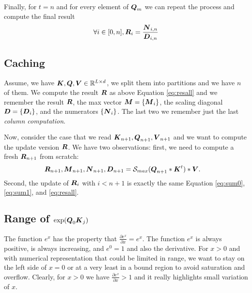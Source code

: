\documentclass[journal]{IEEEtran}
\begin{document}
Finally, for $t=n$ and for every element of ${\boldsymbol Q}_m$ we can repeat
the process and compute the final result
\begin{equation}
  \label{eq:resall}
 \forall i \in [0,n],\/ \Vc{R}_i = \frac{\Vc{N}_{i,n}}{\Vc{D}_{i,n}}
\end{equation}
\begin{comment}
Each $\Vc{R}_i$ are independent.  Space requirements: $\Vc{Q}_i,
\Vc{K}_i, \Vc{V}_i \in \R^{d \times d}$,, $\Vc{Q}_i\Vc{K}_j \in
\R^{d\times d}$, $\exp\Vc{Q}_i\Vc{K}_j \in \R^{d\times d}$
$\Vc{D}_{0,i} \in \R^{d}$, $\Vc{N}_{0,t}\Vc{N}_{0,t+1} \in \R^{d
  \times d}$.

We need to keep in memory $\Vc{D}_{0,t}$ and $\Vc{N}_{0,t}$, we
compute $\exp{\Vc{Q}_0\Vc{K}_{t+1}}$ to add to $\Vc{D}_{0,t}$, we then
compute $(\exp{\Vc{Q}_0\Vc{K}_{t+1}})\Vc{V}_{t+1}$. We need 5 matrices
of size $d \times d$. We store $\Vc{D}_{0,t+1}$ and $\Vc{N}_{0,t+1}$.
\end{comment}

\subsection{Caching}
Assume, we have ${\boldsymbol K},{\boldsymbol Q},{\boldsymbol V} \in \mathbb{R} ^{L\times d}$, we split
them into partitions and we have $n$ of them.  We compute the result
${\boldsymbol R}$ as above Equation \ref{eq:resall} and we remember the result
${\boldsymbol R}$, the max vector ${\boldsymbol M} = \{{\boldsymbol M}_i\}$, the scaling diagonal
$ {\boldsymbol D} = \{ {\boldsymbol D}_{i} \}$, and the numerators
$\{{\boldsymbol N}_{i}\}$. The last two we remember just the last {\em column
  computation}.

Now, consider the case that we read
${\boldsymbol K}_{n+1},{\boldsymbol Q}_{n+1},{\boldsymbol V}_{n+1}$ and we want to compute the
update version ${\boldsymbol R}$. We have two observations: first, we need to
compute a fresh ${\boldsymbol R}_{n+1}$ from scratch:
\begin{align}
  \Vc{R}_{n+1},\Vc{M}_{n+1},\Vc{N}_{n+1}, \Vc{D}_{n+1} &= \Smax{\Vc{Q}_{n+1}*\Vc{K}^t}*\Vc{V}.
\end{align}
Second, the update of ${\boldsymbol R}_i$ with $i<n+1$ is exactly the same
Equation \ref{eq:sum0}, \ref{eq:sum1}, and \ref{eq:resall}.



\subsection{Range of $\exp({\boldsymbol Q}_0{\boldsymbol K}_j)$}
\label{sec:range}
The function $e^x$ has the property that $\frac{\partial e^x}{\partial
  x}= e^x$. The function $e^x$ is always positive, is always
increasing, and $e^0=1$ and also the derivative. For $x>0$ and with
numerical representation that could be limited in range, we want to
stay on the left side of $x=0$ or at a very least in a bound region to
avoid saturation and overflow. Clearly, for $x>0$ we have
$\frac{\partial e^x}{\partial x}>1$ and it really highlights small
variation of $x$.
\end{document}
